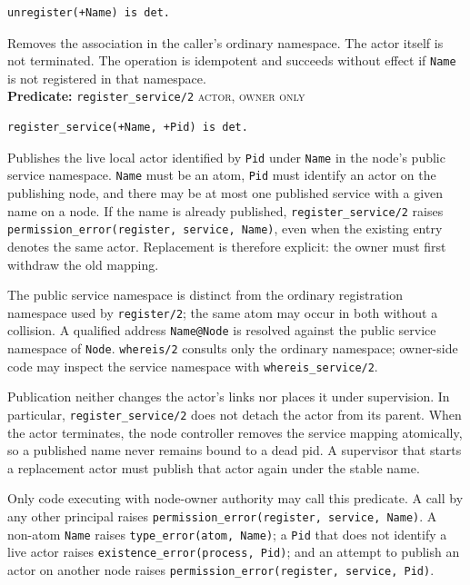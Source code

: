 \begin{verbatim}
unregister(+Name) is det.
\end{verbatim}

\noindent Removes the association in the caller's ordinary namespace. The
actor itself is not terminated. The operation is idempotent and succeeds
without effect if \texttt{Name} is not registered in that namespace.\\


\noindent \textbf{Predicate:} \texttt{register\_\allowbreak{}service/\allowbreak{}2}
\hfill\textsc{actor, owner only}

\begin{verbatim}
register_service(+Name, +Pid) is det.
\end{verbatim}

\noindent Publishes the live local actor identified by \texttt{Pid} under
\texttt{Name} in the node's public service namespace. \texttt{Name} must be
an atom, \texttt{Pid} must identify an actor on the publishing node, and there
may be at most one published service with a given name on a node. If the name
is already published, \texttt{register\_\allowbreak{}service/\allowbreak{}2} raises
\texttt{permission\_\allowbreak{}error(\allowbreak{}register,\allowbreak{}\,\allowbreak{}service,\allowbreak{}\,\allowbreak{}Name)}, even when the existing
entry denotes the same actor. Replacement is therefore explicit: the owner
must first withdraw the old mapping.

The public service namespace is distinct from the ordinary registration
namespace used by \texttt{register/\allowbreak{}2}; the same atom may occur in both without
a collision. A qualified address \texttt{Name@Node} is resolved against the
public service namespace of \texttt{Node}. \texttt{whereis/\allowbreak{}2} consults only
the ordinary namespace; owner-side code may inspect the service namespace with
\texttt{whereis\_\allowbreak{}service/\allowbreak{}2}.

Publication neither changes the actor's links nor places it under
supervision. In particular, \texttt{register\_\allowbreak{}service/\allowbreak{}2} does not detach the
actor from its parent. When the actor terminates, the node controller removes
the service mapping atomically, so a published name never remains bound to a
dead pid. A supervisor that starts a replacement actor must publish that actor
again under the stable name.

Only code executing with node-owner authority may call this predicate. A
call by any other principal raises
\texttt{permission\_\allowbreak{}error(\allowbreak{}register,\allowbreak{}\,\allowbreak{}service,\allowbreak{}\,\allowbreak{}Name)}. A non-atom
\texttt{Name} raises \texttt{type\_\allowbreak{}error(\allowbreak{}atom,\allowbreak{}\,\allowbreak{}Name)}; a \texttt{Pid} that
does not identify a live actor raises
\texttt{existence\_\allowbreak{}error(\allowbreak{}process,\allowbreak{} Pid)}; and an attempt to publish an actor
on another node raises \texttt{permission\_\allowbreak{}error(\allowbreak{}register,\allowbreak{}\,\allowbreak{}service,\allowbreak{}\,\allowbreak{}Pid)}.\\


